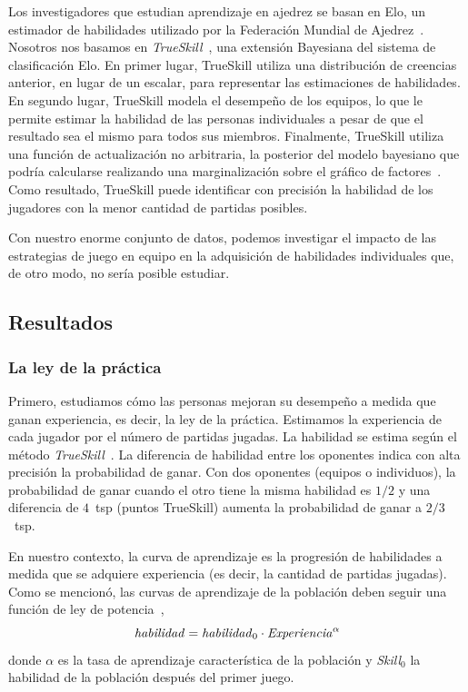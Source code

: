 \documentclass[a4paper,10pt]{book}
\theoremstyle{definition}
\begin{document}
Los investigadores que estudian aprendizaje en ajedrez se basan en Elo, un estimador de habilidades utilizado por la Federación Mundial de Ajedrez~\cite{glickman1995-guideToChessRatings,glickman2001}.
%
Nosotros nos basamos en \emph{TrueSkill}~\cite{Herbrich2007}, una extensión Bayesiana del sistema de clasificación Elo.
%
En primer lugar, TrueSkill utiliza una distribución de creencias anterior, en lugar de un escalar, para representar las estimaciones de habilidades.
%
En segundo lugar, TrueSkill modela el desempeño de los equipos, lo que le permite estimar la habilidad de las personas individuales a pesar de que el resultado sea el mismo para todos sus miembros.
%
Finalmente, TrueSkill utiliza una función de actualización no arbitraria, la posterior del modelo bayesiano que podría calcularse realizando una marginalización sobre el gráfico de factores~\cite{Kschischang2001}.
%
Como resultado, TrueSkill puede identificar con precisión la habilidad de los jugadores con la menor cantidad de partidas posibles.


Con nuestro enorme conjunto de datos, podemos investigar el impacto de las estrategias de juego en equipo en la adquisición de habilidades individuales que, de otro modo, no sería posible estudiar.

\subsection{Resultados}

\subsubsection{La ley de la práctica}

Primero, estudiamos cómo las personas mejoran su desempeño a medida que ganan experiencia, es decir, la ley de la práctica.
%
Estimamos la experiencia de cada jugador por el n\'umero de partidas jugadas.
%
La habilidad se estima seg\'un el método \emph{TrueSkill}~\cite{Herbrich2007}.
%
La diferencia de habilidad entre los oponentes indica con alta precisión la probabilidad de ganar.
%
Con dos oponentes (equipos o individuos), la probabilidad de ganar cuando el otro tiene la misma habilidad es $1/2$ y una diferencia de $4$~tsp (puntos TrueSkill) aumenta la probabilidad de ganar a $2/3$~tsp.


En nuestro contexto, la curva de aprendizaje es la progresión de habilidades a medida que se adquiere experiencia (es decir, la cantidad de partidas jugadas). 
%
Como se mencionó, las curvas de aprendizaje de la población deben seguir una función de ley de potencia~\cite{Newell1981},
%
\begin{equation}\label{lawOfPractice}
   \text{\emph{habilidad}} = \text{\emph{habilidad}}_0 \cdot \text{\emph{Experiencia}}^{\alpha}
\end{equation} 
%
donde $\alpha$ es la tasa de aprendizaje característica de la población y \emph{Skill}$_0$ la habilidad de la población después del primer juego.
\end{document}
